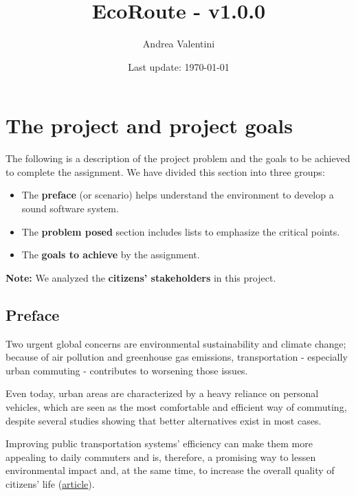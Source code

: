 \documentclass[a4paper]{article}
\newcommand{\highspace}{\vspace{1.2em}\noindent}
\begin{document}
    \author{Andrea Valentini}
    \title{EcoRoute - v1.0.0}
    \date{Last update: \today}
    \maketitle

    \newpage

    \tableofcontents

    \newpage

    \pagestyle{fancy}
    \fancyhead{} %
    \fancyhead[R]{\nouppercase{\leftmark\hfill\rightmark}}

    \section{The project and project goals}

    The following is a description of the project problem and the goals to be achieved to complete the assignment. We have divided this section into three groups:
    \begin{itemize}
        \item The \textbf{preface} (or scenario) helps understand the environment to develop a sound software system.

        \item The \textbf{problem posed} section includes lists to emphasize the critical points.

        \item The \textbf{goals to achieve} by the assignment.
    \end{itemize}
    \textbf{Note:} We analyzed the \textbf{citizens' stakeholders} in this project. 

    \subsection*{Preface}

    Two urgent global concerns are environmental sustainability and climate change; because of air pollution and greenhouse gas emissions, transportation - especially urban commuting - contributes to worsening those issues.

    \highspace
    Even today, urban areas are characterized by a heavy reliance on personal vehicles, which are seen as the most comfortable and efficient way of commuting, despite several studies showing that better alternatives exist in most cases.

    \highspace
    Improving public transportation systems' efficiency can make them more appealing to daily commuters and is, therefore, a promising way to lessen environmental impact and, at the same time, to increase the overall quality of citizens' life (\href{https://journals.plos.org/plosone/article?id=10.1371/journal.pone.0223650}{article}).
\end{document}
